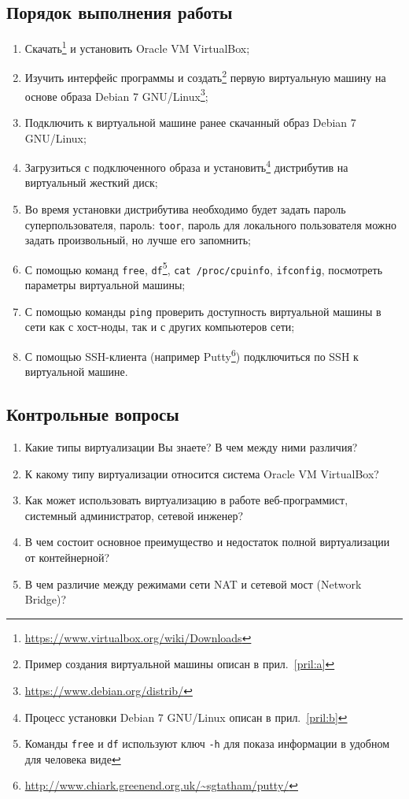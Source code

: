 \subsection{Порядок выполнения работы}

\begin{enumerate}
    \item Скачать\footnote{\url{https://www.virtualbox.org/wiki/Downloads}} и установить Oracle VM VirtualBox;
    \item Изучить интерфейс программы и создать\footnote{Пример создания виртуальной машины описан в прил.~\ref{pril:a}} первую виртуальную машину на основе образа Debian 7 GNU/Linux\footnote{\url{https://www.debian.org/distrib/}};
    \item Подключить к виртуальной машине ранее скачанный образ Debian 7 GNU/Linux;
    \item Загрузиться с подключенного образа и установить\footnote{Процесс установки Debian 7 GNU/Linux описан в прил.~\ref{pril:b}} дистрибутив на виртуальный жесткий диск;
    \item Во время установки дистрибутива необходимо будет задать пароль суперпользователя, пароль: \texttt{toor}, пароль для локального пользователя можно задать произвольный, но лучше его запомнить;
    \item С помощью команд \texttt{free}, \texttt{df}\footnote{Команды \texttt{free} и \texttt{df} используют ключ \texttt{-h} для показа информации в удобном для человека виде}, \texttt{cat /proc/cpuinfo}, \texttt{ifconfig}, посмотреть параметры виртуальной машины;
    \item С помощью команды \texttt{ping} проверить доступность виртуальной машины в сети как с хост-ноды, так и с других компьютеров сети;
    \item С помощью SSH-клиента (например Putty\footnote{\url{http://www.chiark.greenend.org.uk/~sgtatham/putty/}}) подключиться по SSH к виртуальной машине.
\end{enumerate}

\subsection{Контрольные вопросы}
\begin{enumerate}
    \item Какие типы виртуализации Вы знаете? В чем между ними различия?
    \item К какому типу виртуализации относится система Oracle VM VirtualBox?
    \item Как может использовать виртуализацию в работе веб-программист, системный администратор, сетевой инженер?
    \item В чем состоит основное преимущество и недостаток полной виртуализации от контейнерной?
    \item В чем различие между режимами сети NAT и сетевой мост (Network Bridge)?
\end{enumerate}

\clearpage
